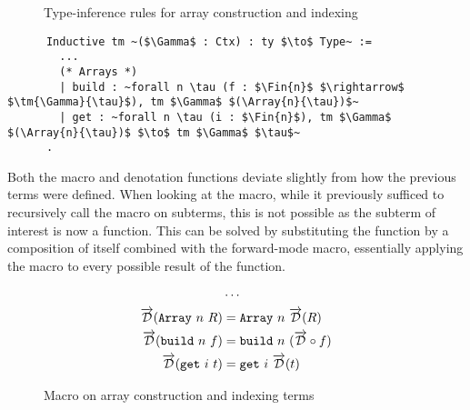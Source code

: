 
  \begin{figure}
    \caption{Type-inference rules for array construction and indexing}
    \label{fig:array_infer}
  \end{figure}

  \begin{listing}
    \begin{verbatim}
      Inductive tm ~($\Gamma$ : Ctx) : ty $\to$ Type~ :=
        ...
        (* Arrays *)
        | build : ~forall n \tau (f : $\Fin{n}$ $\rightarrow$ $\tm{\Gamma}{\tau}$), tm $\Gamma$ $(\Array{n}{\tau})$~
        | get : ~forall n \tau (i : $\Fin{n}$), tm $\Gamma$ $(\Array{n}{\tau})$ $\to$ tm $\Gamma$ $\tau$~
      .
    \end{verbatim}
    \caption{The terms related to array types included in our language}
    \label{lst:tm_array}
  \end{listing}

  Both the macro and denotation functions deviate slightly from how the previous terms were defined.
  When looking at the macro, while it previously sufficed to recursively call the macro on subterms, this is not possible as the subterm of interest is now a function.
  This can be solved by substituting the function by a composition of itself combined with the forward-mode macro, essentially applying the macro to every possible result of the function.

  \begin{figure}
    \centering
    \begin{align*}
        &\cdots \\
        \overrightarrow{\mathcal{D}}(\texttt{Array}\ n\ R) &= \texttt{Array}\ n\ \overrightarrow{\mathcal{D}}(R) \\
        \overrightarrow{\mathcal{D}}(\texttt{build}\ n\ f) &= \texttt{build}\ n\ (\overrightarrow{\mathcal{D}} \circ f) \\
        \overrightarrow{\mathcal{D}}(\texttt{get}\ i\ t) &= \texttt{get}\ i\ \overrightarrow{\mathcal{D}}(t)
    \end{align*}
    \caption{Macro on array construction and indexing terms}
    \label{eqn:macro_array}
  \end{figure}

